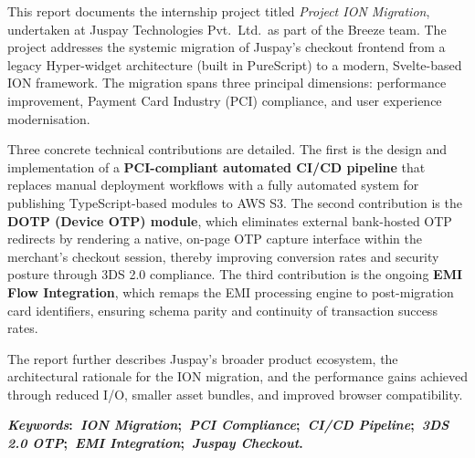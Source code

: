 \thispagestyle{empty}

\noindent
This report documents the internship project titled \textit{Project ION Migration}, undertaken at Juspay Technologies Pvt.\ Ltd.\ as part of the Breeze team. The project addresses the systemic migration of Juspay's checkout frontend from a legacy Hyper-widget architecture (built in PureScript) to a modern, Svelte-based ION framework. The migration spans three principal dimensions: performance improvement, Payment Card Industry (PCI) compliance, and user experience modernisation.

\vspace{4mm}
\noindent
Three concrete technical contributions are detailed. The first is the design and implementation of a \textbf{PCI-compliant automated CI/CD pipeline} that replaces manual deployment workflows with a fully automated system for publishing TypeScript-based modules to AWS S3. The second contribution is the \textbf{DOTP (Device OTP) module}, which eliminates external bank-hosted OTP redirects by rendering a native, on-page OTP capture interface within the merchant's checkout session, thereby improving conversion rates and security posture through 3DS 2.0 compliance. The third contribution is the ongoing \textbf{EMI Flow Integration}, which remaps the EMI processing engine to post-migration card identifiers, ensuring schema parity and continuity of transaction success rates.

\vspace{4mm}
\noindent
The report further describes Juspay's broader product ecosystem, the architectural rationale for the ION migration, and the performance gains achieved through reduced I/O, smaller asset bundles, and improved browser compatibility.

\vspace{5mm}
\noindent\textbf{\textit{Keywords}:~\textit{ION Migration};~\textit{PCI Compliance};~\textit{CI/CD Pipeline};~\textit{3DS 2.0 OTP};~\textit{EMI Integration};~\textit{Juspay Checkout}.}
